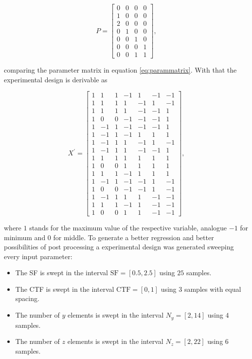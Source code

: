 \begin{equation}
P = \begin{bmatrix}
0 & 0 & 0 & 0\\
1 & 0 & 0 & 0\\
2 & 0 & 0 & 0\\
0 & 1 & 0 & 0\\
0 & 0 & 1 & 0\\
0 & 0 & 0 & 1\\
0 & 0 & 1 & 1
\end{bmatrix},
\end{equation}

comparing the parameter matrix in equation \ref{eq:parammatrix}. With that the experimental design is derivable as 

\begin{equation}
X^\prime = \begin{bmatrix}
1&1&1&-1&1&-1&-1\\
1&1&1&1&-1&1&-1\\
1&1&1&1&-1&-1&1\\
1&0&0&-1&-1&-1&1\\
1&-1&1&-1&-1&-1&1\\
1&-1&1&-1&1&1&1\\
1&-1&1&1&-1&1&-1\\
1&-1&1&1&-1&-1&1\\
1&1&1&1&1&1&1\\
1&0&0&1&1&1&1\\
1&1&1&-1&1&1&1\\
1&-1&1&-1&-1&1&-1\\
1&0&0&-1&-1&1&-1\\
1&-1&1&1&1&-1&-1\\
1&1&1&-1&1&-1&-1\\
1&0&0&1&1&-1&-1
\end{bmatrix},
\end{equation}

where $1$ stands for the maximum value of the respective variable, analogue $-1$ for minimum and $0$ for middle. To generate a better regression and better possibilities of post processing a experimental design was generated sweeping every input parameter:

\begin{itemize}
\item The \ac{SF} is swept in the interval $\text{SF}=\left[0.5,2.5\right]$ using $25$ samples.
\item The \ac{CTF} is swept in the interval $\text{CTF}=\left[0,1\right]$ using $3$ samples with equal spacing.
\item The number of $y$ elements is swept in the interval $N_y=\left[2,14\right]$ using $4$ samples.
\item The number of $z$ elements is swept in the interval $N_z=\left[2,22\right]$ using $6$ samples.
\end{itemize}

